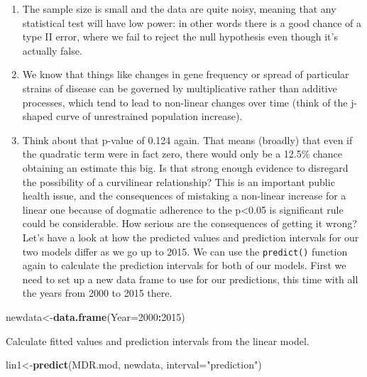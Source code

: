 \documentclass[
]{book}
\newenvironment{Shaded}{\begin{snugshade}}{\end{snugshade}}
\newcommand{\DataTypeTok}[1]{\textcolor[rgb]{0.13,0.29,0.53}{#1}}
\newcommand{\DecValTok}[1]{\textcolor[rgb]{0.00,0.00,0.81}{#1}}
\newcommand{\KeywordTok}[1]{\textcolor[rgb]{0.13,0.29,0.53}{\textbf{#1}}}
\newcommand{\NormalTok}[1]{#1}
\newcommand{\OperatorTok}[1]{\textcolor[rgb]{0.81,0.36,0.00}{\textbf{#1}}}
\newcommand{\StringTok}[1]{\textcolor[rgb]{0.31,0.60,0.02}{#1}}
\begin{document}
\begin{enumerate}
\def\labelenumi{\arabic{enumi})}
\item
  The sample size is small and the data are quite noisy, meaning that any statistical test will have low power: in other words there is a good chance of a type II error, where we fail to reject the null hypothesis even though it's actually false.
\item
  We know that things like changes in gene frequency or spread of particular strains of disease can be governed by multiplicative rather than additive processes, which tend to lead to non-linear changes over time (think of the j-shaped curve of unrestrained population increase).
\item
  Think about that p-value of 0.124 again. That means (broadly) that even if the quadratic term were in fact zero, there would only be a 12.5\% chance obtaining an estimate this big. Is that strong enough evidence to disregard the possibility of a curvilinear relationship? This is an important public health issue, and the consequences of mistaking a non-linear increase for a linear one because of dogmatic adherence to the p\textless0.05 is significant rule could be considerable.
  How serious are the consequences of getting it wrong? Let's have a look at how the predicted values and prediction intervals for our two models differ as we go up to 2015. We can use the \texttt{predict()} function again to calculate the prediction intervals for both of our models. First we need to set up a new data frame to use for our predictions, this time with all the years from 2000 to 2015 there.
\end{enumerate}

\begin{Shaded}
\begin{Highlighting}[]
\NormalTok{newdata<-}\KeywordTok{data.frame}\NormalTok{(}\DataTypeTok{Year=}\DecValTok{2000}\OperatorTok{:}\DecValTok{2015}\NormalTok{)}
\end{Highlighting}
\end{Shaded}

Calculate fitted values and prediction intervals from the linear model.

\begin{Shaded}
\begin{Highlighting}[]
\NormalTok{lin1<-}\KeywordTok{predict}\NormalTok{(MDR.mod, newdata, }\DataTypeTok{interval=}\StringTok{"prediction"}\NormalTok{)}
\end{Highlighting}
\end{Shaded}
\end{document}
